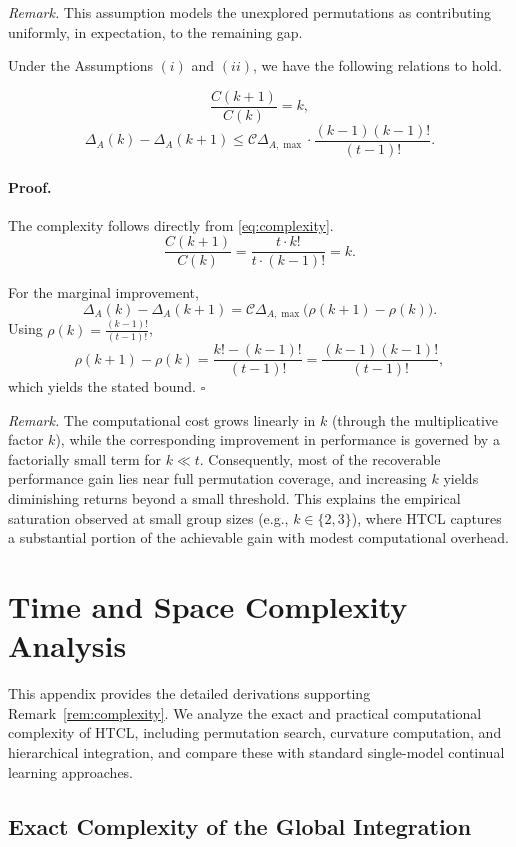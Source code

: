 \emph{Remark.} This assumption models the unexplored permutations as contributing uniformly, in expectation, to the remaining gap. %

\begin{proposition}
    Under the Assumptions $(i)$ and $(ii)$, we have the following relations to hold.

\[
\frac{C(k+1)}{C(k)} = k,
\]
\[
\Delta_A(k) - \Delta_A(k+1) \le \mathcal{C} \Delta_{A,\max} \cdot \frac{(k-1)(k-1)!}{(t-1)!}.
\]
\end{proposition}

\paragraph{Proof.}
The complexity follows directly from \eqref{eq:complexity}. %
\[
\frac{C(k+1)}{C(k)} = \frac{t \cdot k!}{t \cdot (k-1)!} = k.
\]

For the marginal improvement,
\[
\Delta_A(k) - \Delta_A(k+1)
= \mathcal{C} \Delta_{A,\max} \big(\rho(k+1) - \rho(k)\big).
\]
Using $\rho(k)=\frac{(k-1)!}{(t-1)!}$,
\[
\rho(k+1) - \rho(k)
= \frac{k! - (k-1)!}{(t-1)!}
= \frac{(k-1)(k-1)!}{(t-1)!},
\]
which yields the stated bound. \hfill $\square$

\emph{Remark.}
The computational cost grows linearly in $k$ (through the multiplicative factor $k$), while the corresponding improvement in performance is governed by a factorially small term for $k \ll t$. Consequently, most of the recoverable performance gain lies near full permutation coverage, and increasing $k$ yields diminishing returns beyond a small threshold. This explains the empirical saturation observed at small group sizes (e.g., $k \in \{2,3\}$), where HTCL captures a substantial portion of the achievable gain with modest computational overhead.

\section{Time and Space Complexity Analysis}
\label{app:complexity}

This appendix provides the detailed derivations supporting Remark~\ref{rem:complexity}.  
We analyze the exact and practical computational complexity of HTCL, including permutation search, 
curvature computation, and hierarchical integration, and compare these with  
standard single-model continual learning approaches.

\subsection{Exact Complexity of the Global Integration}

